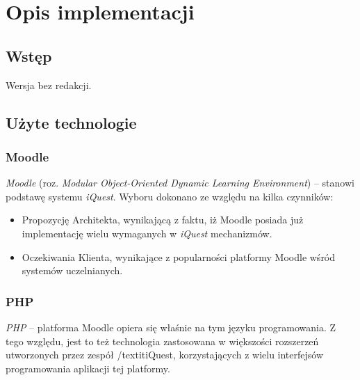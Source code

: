 \chapter{Opis implementacji}
\label{Chapter6}

\section{Wstęp}
\label{Chapter61}

{\color{red}Wersja bez redakcji.}

%
\section{Użyte technologie}
\label{Chapter62}

\subsection{Moodle}
\emph{Moodle} (roz. \textit{Modular Object-Oriented Dynamic Learning Environment}) -- stanowi podstawę systemu \textit{iQuest}. Wyboru dokonano ze względu na kilka czynników:
\begin{itemize}
\item{Propozycję Architekta, wynikającą z faktu, iż Moodle posiada już implementację wielu wymaganych w \textit{iQuest} mechanizmów.}
\item{Oczekiwania Klienta, wynikające z popularności platformy Moodle wśród systemów uczelnianych.}
\end{itemize}

\subsection{PHP}
\emph{PHP} -- platforma Moodle opiera się właśnie na tym języku programowania. Z tego względu, jest to też technologia zastosowana w większości rozszerzeń utworzonych przez zespół /textit{iQuest}, korzystających z wielu interfejsów programowania aplikacji tej platformy.

